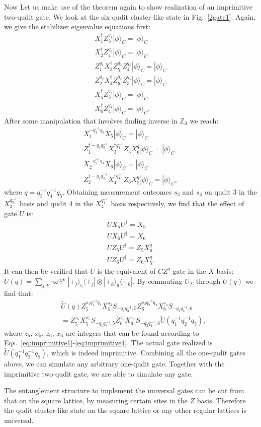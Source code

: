 \documentclass[aps,amsfonts,pra,twocolumn,showpacs]{revtex4-1}
\newcommand{\zd}{\mathbb{Z}_d}
\begin{document}
	Now Let us make use of the theorem again to show realization of an imprimitive two-qudit gate. We look at the six-qudit cluster-like state in Fig.~\ref{2gate1}. Again, we give the stabilizer eigenvalue equations first:
		\begin{align}
		X_1^\dagger Z_3^{q_1} |\phi\rangle_C = |\phi\rangle_C \\
		X_2^\dagger Z_4^{q_2} |\phi\rangle_C = |\phi\rangle_C \\
		Z_1^{q_1} X_3^\dagger Z_5^{q_3} Z_4^{q_5} |\phi\rangle_C = |\phi\rangle_C \\
		Z_2^{q_2} X_4^\dagger Z_6^{q_4} Z_3^{q_5} |\phi\rangle_C = |\phi\rangle_C \\
		X_5^\dagger Z_3^{q_3} |\phi\rangle_C = |\phi\rangle_C \\
		X_6^\dagger Z_4^{q_4} |\phi\rangle_C = |\phi\rangle_C.
		\end{align}
	After some manipulation that involves finding inverse in $\zd$ we reach:
		\begin{align}
		X_1^{-q_1^{-1}q_3} X_5 |\phi\rangle_C = |\phi\rangle_C \\
		Z_1^{\dagger -q_1q_3^{-1}} X_3^{\dagger q_3^{-1}} Z_5 X_6^q |\phi\rangle_C = |\phi\rangle_C \\
		X_2^{-q_2^{-1}q_4} X_6 |\phi\rangle_C = |\phi\rangle_C \\
		Z_2^{\dagger -q_2q_4^{-1}} X_4^{\dagger q_4^{-1}} Z_6 X_5^q |\phi\rangle_C = |\phi\rangle_C,
		\end{align}
	where $q=q_3^{-1}q_4^{-1}q_5$. Obtaining measurement outcomes $s_3$ and $s_4$ on qudit 3 in the $X_3^{q_3^{-1}}$ basis and qudit 4 in the $X_4^{q_4^{-1}}$ basis respectively, we find that the effect of gate $U$ is:
		\begin{align}
		UX_5U^\dagger = X_5 \label{eq:imprimitive1} \\
		UX_6U^\dagger = X_6 \label{eq:imprimitive2} \\
		UZ_5U^\dagger = Z_5 X_6^q \label{eq:imprimitive3} \\
		UZ_6U^\dagger = Z_6 X_5^q. \label{eq:imprimitive4}
		\end{align}
	It can then be verified that $U$ is the equivalent of $CZ^q$ gate in the $X$ basis: $\tilde{U}(q)=\sum_{j, k}\varpi^{qjk} |+_j\rangle_5\langle+_j| \otimes |+_k\rangle_6\langle+_k|$. By commuting $U_\Sigma$ through $\tilde{U}(q)$ we find that:
		\begin{align}
		& \tilde{U}(q) Z_5^{s_1q_1^{-1}q_3}X_5^{s_3}S_{-q_1q_3^{-1}, 5} Z_6^{s_2q_2^{-1}q_4}X_6^{s_4}S_{-q_2q_4^{-1}, 6} \nonumber \\
		& = Z_5^{z_5}X_5^{x_5}S_{-q_1q_3^{-1}, 5} Z_6^{z_6}X_6^{x_6}S_{-q_2q_4^{-1}, 6} \tilde{U}(q_1^{-1}q_2^{-1}q_5),
		\end{align}
	where $z_5, \, x_5, \, z_6, \, x_6$ are integers that can be found according to Eqs.~\ref{eq:imprimitive1}-\ref{eq:imprimitive4}. The actual gate realized is $\tilde{U}(q_1^{-1}q_2^{-1}q_5)$, which is indeed imprimitive. Combining all the one-qudit gates above, we can simulate any arbitrary one-qudit gate. Together with the imprimitive two-qudit gate, we are able to simulate any gate.
	
	The entanglement structure to implement the universal gates can be cut from that on the square lattice, by measuring certain sites in the $Z$ basis. Therefore the qudit cluster-like state on the square lattice or any other regular lattices is universal.
	
\end{document}
